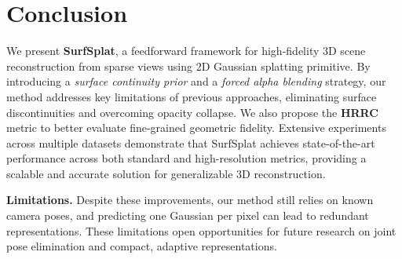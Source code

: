 \section{Conclusion}
We present \textbf{SurfSplat}, a feedforward framework for high-fidelity 3D scene reconstruction from sparse views using 2D Gaussian splatting primitive. By introducing a \textit{surface continuity prior} and a \textit{forced alpha blending} strategy, our method addresses key limitations of previous approaches, eliminating surface discontinuities and overcoming opacity collapse. We also propose the \textbf{HRRC} metric to better evaluate fine-grained geometric fidelity. Extensive experiments across multiple datasets demonstrate that SurfSplat achieves state-of-the-art performance across both standard and high-resolution metrics, providing a scalable and accurate solution for generalizable 3D reconstruction. 

\noindent\textbf{Limitations.} Despite these improvements, our method still relies on known camera poses, and predicting one Gaussian per pixel can lead to redundant representations. These limitations open opportunities for future research on joint pose elimination and compact, adaptive representations.

\newpage